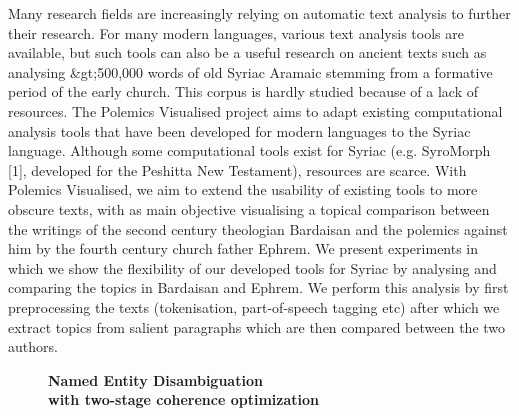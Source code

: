 \documentclass[10pt, a4paper, twopage, headinclude, footinclude, BCOR5mm]{scrartcl}
\begin{document}
\noindent
Many research fields are increasingly relying on automatic text analysis to further their research. For many modern languages, various text analysis tools are available, but such tools can also be a useful research on ancient texts such as analysing \&gt;500,000 words of old Syriac Aramaic stemming from a formative period of the early church. This corpus is hardly studied because of a lack of resources. The Polemics Visualised project aims to adapt existing computational analysis tools that have been developed for modern languages to the Syriac language. Although some computational tools exist for Syriac (e.g. SyroMorph [1], developed for the Peshitta New Testament), resources are scarce. With Polemics Visualised, we aim to extend the usability of existing tools to more obscure texts, with as main objective visualising a topical comparison between the writings of the second century theologian Bardaisan and the polemics against him by the fourth century church father Ephrem. We present experiments in which we show the flexibility of our developed tools for Syriac by analysing and comparing the topics in Bardaisan and Ephrem. We perform this analysis by first preprocessing the texts (tokenisation, part-of-speech tagging etc) after which we extract topics from salient paragraphs which are then compared between the two authors.


\newpage

\begin{figure}[t!]
\centering
\large\textbf{Named Entity Disambiguation \\ with two-stage coherence optimization}
\vspace*{0.5cm}
\end{figure}
\end{document}

